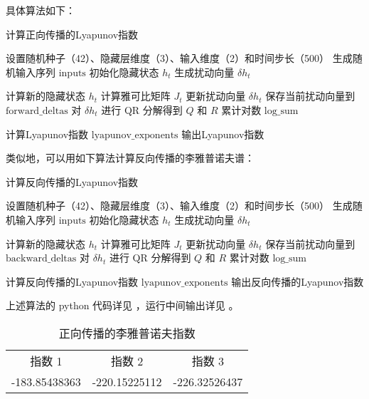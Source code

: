 \documentclass[12pt,a4paper]{amsart}
\begin{document}
具体算法如下：

\begin{algorithm}
   \caption{计算正向传播的Lyapunov指数}
   \begin{algorithmic}[1]
      \State 设置随机种子（42）、隐藏层维度（3）、输入维度（2）和时间步长（500）
      \State 生成随机输入序列 $\text{inputs}$
      \State 初始化隐藏状态 $h_t$
      \State 生成扰动向量 $\delta h_t$

            \State 计算新的隐藏状态 $h_t$
            \State 计算雅可比矩阵 $J_t$
            \State 更新扰动向量 $\delta h_t$
            \State 保存当前扰动向量到 $\text{forward\_deltas}$
            \State 对 $\delta h_t$ 进行 QR 分解得到 $Q$ 和 $R$
            \State 累计对数 $\text{log\_sum}$
      \EndFor

      \State 计算Lyapunov指数 $\text{lyapunov\_exponents}$
      \State 输出Lyapunov指数
   \end{algorithmic}
\end{algorithm}

类似地，可以用如下算法计算反向传播的李雅普诺夫谱：

\begin{algorithm}
   \caption{计算反向传播的Lyapunov指数}
   \begin{algorithmic}[1]
      \State 设置随机种子（42）、隐藏层维度（3）、输入维度（2）和时间步长（500）
      \State 生成随机输入序列 $\text{inputs}$
      \State 初始化隐藏状态 $h_t$
      \State 生成扰动向量 $\delta h_t$

            \State 计算新的隐藏状态 $h_t$
            \State 计算雅可比矩阵 $J_t$
            \State 更新扰动向量 $\delta h_t$
            \State 保存当前扰动向量到 $\text{backward\_deltas}$
            \State 对 $\delta h_t$ 进行 QR 分解得到 $Q$ 和 $R$
            \State 累计对数 $\text{log\_sum}$
      \EndFor

      \State 计算反向传播的Lyapunov指数 $\text{lyapunov\_exponents}$
      \State 输出反向传播的Lyapunov指数
   \end{algorithmic}
\end{algorithm}

上述算法的 python 代码详见 \cite{sec:code}，运行中间输出详见 \cite{sec:result}。

\begin{table}[htbp]
   \caption{正向传播的李雅普诺夫指数}
   \begin{tabular}{ccc}
      指数 1 & 指数 2 & 指数 3 \\
      -183.85438363 & -220.15225112 & -226.32526437
   \end{tabular}
\end{table}
\end{document}
